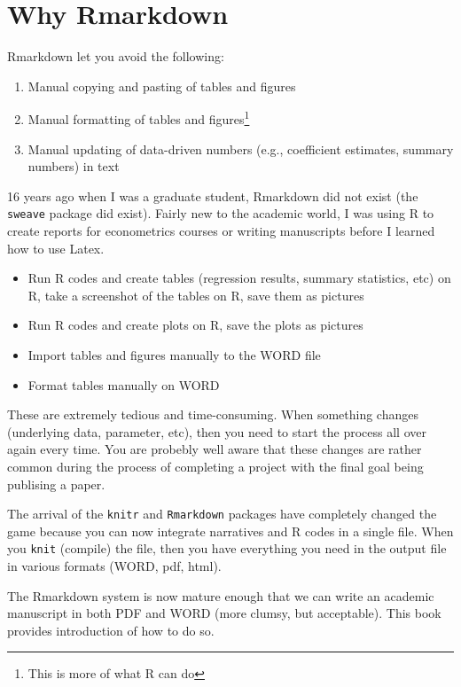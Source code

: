 \documentclass[
  letterpaper,
  DIV=11,
  numbers=noendperiod]{scrreprt}
\providecommand{\tightlist}{%
  \setlength{\itemsep}{0pt}\setlength{\parskip}{0pt}}\usepackage{longtable,booktabs,array}
\begin{document}
\hypertarget{why-rmarkdown}{%
\section{Why Rmarkdown}\label{why-rmarkdown}}

Rmarkdown let you avoid the following:

\begin{enumerate}
\def\labelenumi{\arabic{enumi}.}
\tightlist
\item
  Manual copying and pasting of tables and figures
\item
  Manual formatting of tables and figures\footnote{This is more of what
    R can do}
\item
  Manual updating of data-driven numbers (e.g., coefficient estimates,
  summary numbers) in text
\end{enumerate}

16 years ago when I was a graduate student, Rmarkdown did not exist (the
\texttt{sweave} package did exist). Fairly new to the academic world, I
was using R to create reports for econometrics courses or writing
manuscripts before I learned how to use Latex.

\begin{itemize}
\tightlist
\item
  Run R codes and create tables (regression results, summary statistics,
  etc) on R, take a screenshot of the tables on R, save them as pictures
\item
  Run R codes and create plots on R, save the plots as pictures
\item
  Import tables and figures manually to the WORD file
\item
  Format tables manually on WORD
\end{itemize}

These are extremely tedious and time-consuming. When something changes
(underlying data, parameter, etc), then you need to start the process
all over again every time. You are probebly well aware that these
changes are rather common during the process of completing a project
with the final goal being publising a paper.

The arrival of the \texttt{knitr} and \texttt{Rmarkdown} packages have
completely changed the game because you can now integrate narratives and
R codes in a single file. When you \texttt{knit} (compile) the file,
then you have everything you need in the output file in various formats
(WORD, pdf, html).

The Rmarkdown system is now mature enough that we can write an academic
manuscript in both PDF and WORD (more clumsy, but acceptable). This book
provides introduction of how to do so.
\end{document}
